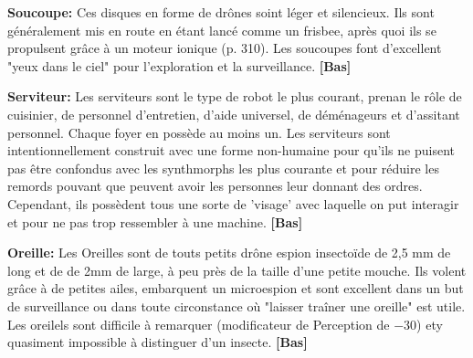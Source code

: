 \textbf{Soucoupe:} Ces disques en forme de drônes soint léger et silencieux. Ils sont généralement mis en route en étant lancé comme un frisbee, après quoi ils se propulsent grâce à un moteur ionique (p. 310). Les soucoupes font d'excellent "yeux dans le ciel" pour l'exploration et la surveillance. \textbf{[Bas]} 

\textbf{Serviteur:} Les serviteurs sont le type de robot le plus courant, prenan le rôle de cuisinier, de personnel d'entretien, d'aide universel, de déménageurs et d'assitant personnel. Chaque foyer en possède au moins un. Les serviteurs sont intentionnellement construit avec une forme non-humaine pour qu'ils ne puisent pas être confondus avec les synthmorphs les plus courante et pour réduire les remords pouvant que peuvent avoir les personnes leur donnant des ordres. Cependant, ils possèdent tous une sorte de 'visage' avec laquelle on put interagir et pour ne pas trop ressembler à une machine. \textbf{[Bas]} 

\textbf{Oreille:} Les Oreilles sont de touts petits drône espion insectoïde de 2,5 mm de long et de de 2mm de large, à peu près de la taille d'une petite mouche. Ils volent grâce à de petites ailes, embarquent un microespion et sont excellent dans un but de surveillance ou dans toute circonstance où "laisser traîner une oreille" est utile. Les oreilels sont difficile à remarquer (modificateur de Perception de $-$30) ety quasiment impossible à distinguer d'un insecte. \textbf{[Bas]} 

